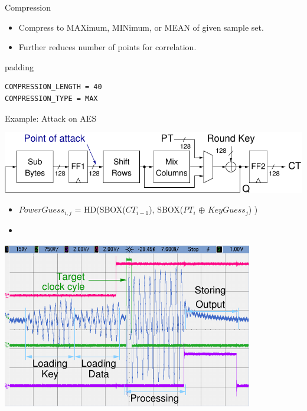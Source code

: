 \documentclass[xcolor=pdftex,dvipsnames,table,final]{beamer}
\begin{document}
\begin{frame}[fragile]{}
\begin{columns}[t]
\begin{column}{.31\linewidth}
\begin{block}{Compression}
\begin{minipage}[t]{0.49\linewidth}
\begin{itemize}
           \item Compress to MAXimum, MINimum, or MEAN of given sample set.
           \item Further reduces number of points for correlation.
         \end{itemize} 
          \begin{center}
            \begin{beamercolorbox}[rounded=true]{padding}%
               \footnotesize%
              \begin{lstlisting}
COMPRESSION_LENGTH = 40
COMPRESSION_TYPE = MAX
              \end{lstlisting}
            \end{beamercolorbox}
          \end{center}
        \end{minipage}
       \end{block}
       \begin{block}{Example: Attack on AES}
         \begin{center}
           \includegraphics[width=0.9\linewidth]{../figures/aes128}
         \end{center}
         \begin{itemize}
		 \item {\small $PowerGuess_{i, j}$ = HD(SBOX($CT_{i-1}$), SBOX($PT_{i}$ $\oplus$ $KeyGuess_{j}$) )}
		 \item
         \end{itemize}
	 \begin{minipage}[t]{0.49\linewidth}
			\includegraphics[width=0.80\linewidth]{../figures/oscilloscope-all-4ch} 
	 

\end{minipage}
\end{block}
\end{column}
\end{columns}
\end{frame}
\end{document}
